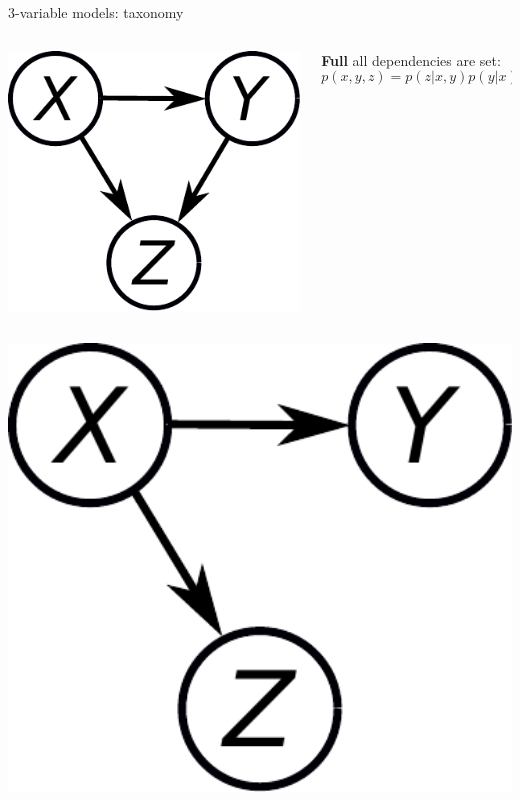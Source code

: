 \documentclass{beamer}
\begin{document}
\begin{frame}{3-variable models: taxonomy}
 \begin{columns}
  \begin{column}{0.12\textwidth}%
   \includegraphics[width=1.2\textwidth]{fig/full-xyz.pdf}
  \end{column}%
  \begin{column}{0.8\textwidth}
  \textbf{Full}\;\; all dependencies are set:
  \[p(x,y,z) = p(z|x,y)p(y|x)p(x)\]
  \end{column}
 \end{columns}\vspace{3mm}
 \pause
  \begin{columns}
  \begin{column}{0.12\textwidth}%
   \includegraphics[width=1.2\textwidth]{fig/twokids-xyz.pdf}

\end{column}
\end{columns}
\end{frame}
\end{document}
